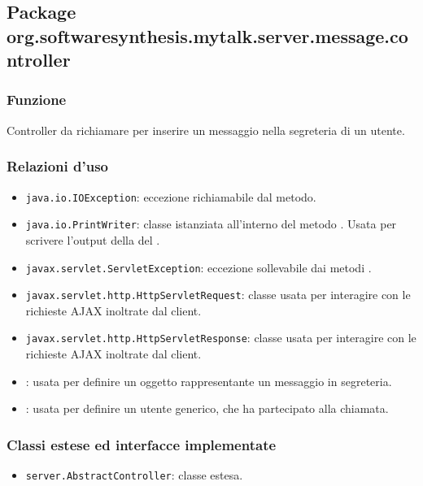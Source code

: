 \subsection{Package org.softwaresynthesis.mytalk.server.message.controller}\label{sec:messageServlet}


\subsubsection*{Funzione}
Controller da richiamare per inserire un messaggio nella segreteria di un utente.

\subsubsection*{Relazioni d'uso}
\begin{itemize}
	\item \texttt{java.io.IOException}: eccezione richiamabile dal metodo.
	\item \texttt{java.io.PrintWriter}: classe istanziata all'interno del metodo . Usata per scrivere l'output della del .
	\item \texttt{javax.servlet.ServletException}: eccezione sollevabile dai metodi .
	\item \texttt{javax.servlet.http.HttpServletRequest}: classe usata per interagire con le richieste AJAX inoltrate dal client.
	\item \texttt{javax.servlet.http.HttpServletResponse}: classe usata per interagire con le richieste AJAX inoltrate dal client.
	\item {}: usata per definire un oggetto rappresentante un messaggio in segreteria.
	\item {}: usata per definire un utente generico, che ha partecipato alla chiamata.
\end{itemize}

\subsubsection*{Classi estese ed interfacce implementate}
\begin{itemize}
	\item \texttt{server.AbstractController}: classe estesa.
\end{itemize}

